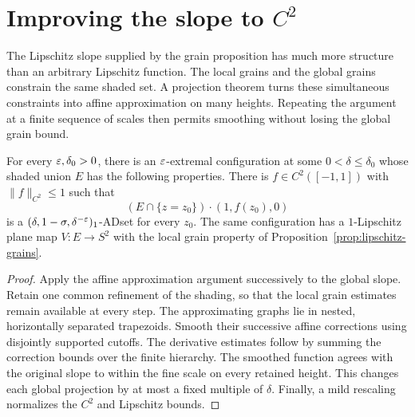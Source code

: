 \chapter{Improving the slope to $C^2$}
\label{chap:smooth-grains}

The Lipschitz slope supplied by the grain proposition has much more
structure than an arbitrary Lipschitz function. The local grains and
the global grains constrain the same shaded set. A projection theorem
turns these simultaneous constraints into affine approximation on
many heights. Repeating the argument at a finite sequence of scales
then permits smoothing without losing the global grain bound.

\begin{proposition}
\label{prop:c2-grains}
\leanok
{}
For every $\varepsilon,\delta_0>0$, there is an $\varepsilon$-extremal
configuration at some $0<\delta\leq\delta_0$ whose shaded union $E$
has the following properties. There is $f\in C^2([-1,1])$ with
$\|f\|_{C^2}\leq1$ such that
\[
              (E\cap\{z=z_0\})\cdot(1,f(z_0),0)
\]
is a $(\delta,1-\sigma,\delta^{-\varepsilon})_1$-ADset for every $z_0$.
The same configuration has a $1$-Lipschitz plane map $V:E\to S^2$
with the local grain property of Proposition~\ref{prop:lipschitz-grains}.
\end{proposition}
\begin{proof}
\leanok
Apply the affine approximation argument successively to the global
slope. Retain one common refinement of the shading, so that the local
grain estimates remain available at every step. The approximating
graphs lie in nested, horizontally separated trapezoids. Smooth their
successive affine corrections using disjointly supported cutoffs.
The derivative estimates follow by summing the correction bounds over
the finite hierarchy. The smoothed function agrees with the original
slope to within the fine scale on every retained height. This changes
each global projection by at most a fixed multiple of $\delta$.
Finally, a mild rescaling normalizes the $C^2$ and Lipschitz bounds.
\end{proof}

